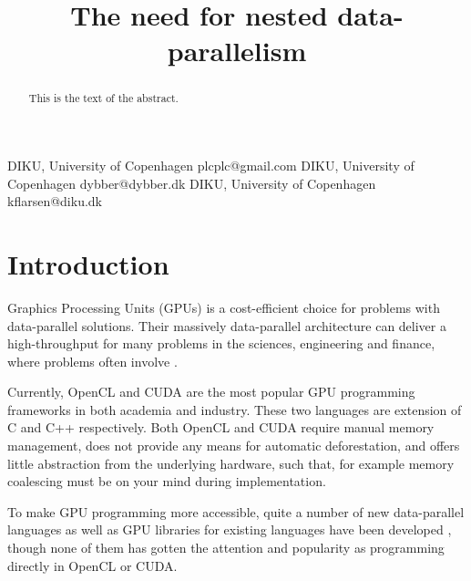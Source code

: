 \documentclass[preprint]{sigplanconf}
\begin{document}
\copyrightdata{[to be supplied]} 


\title{The need for nested data-parallelism}

           {DIKU, University of Copenhagen}
           {plcplc@gmail.com}
           {DIKU, University of Copenhagen}
           {dybber@dybber.dk}
           {DIKU, University of Copenhagen}
           {kflarsen@diku.dk}

\maketitle

\begin{abstract}
This is the text of the abstract.
\end{abstract}




\section{Introduction}
Graphics Processing Units (GPUs) is a cost-efficient choice for
problems with data-parallel solutions. Their massively data-parallel
architecture can deliver a high-throughput for many problems in the
sciences, engineering and finance, where problems often involve
.

Currently, OpenCL and CUDA are the most popular GPU programming
frameworks in both academia and industry. These two languages are
extension of C and C++ respectively. Both OpenCL and CUDA require
manual memory management, does not provide any means for automatic
deforestation, and offers little abstraction from the underlying
hardware, such that, for example memory coalescing must be on your
mind during implementation.

To make GPU programming more accessible, quite a number of new
data-parallel languages as well as GPU libraries for existing
languages have been developed \cite{Catanzaro2011,
  chakravarty2011accelerating, mainland2010nikola,
  svensson2011obsidian, bergstra2010theano, homepage:rgpu,
  bergstrom2012nested},  though none of them has gotten the attention
and popularity as programming directly in OpenCL or CUDA.
\end{document}
